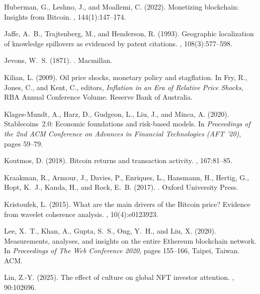 \documentclass[12pt]{article}
\begin{document}
\begin{thebibliography}{}
Huberman, G., Leshno, J., and Moallemi, C. (2022).
\newblock Monetizing blockchain: Insights from Bitcoin.
, 144(1):147--174.

Jaffe, A.~B., Trajtenberg, M., and Henderson, R. (1993).
\newblock Geographic localization of knowledge spillovers as evidenced by
  patent citations.
, 108(3):577--598.

Jevons, W.~S. (1871).
.
\newblock Macmillan.

Kilian, L. (2009).
\newblock Oil price shocks, monetary policy and stagflation.
\newblock In Fry, R., Jones, C., and Kent, C., editors, {\em Inflation in an
  Era of Relative Price Shocks}, RBA Annual Conference Volume. Reserve Bank of
  Australia.

Klages-Mundt, A., Harz, D., Gudgeon, L., Liu, J., and Minca, A. (2020).
\newblock Stablecoins 2.0: Economic foundations and risk-based models.
\newblock In {\em Proceedings of the 2nd ACM Conference on Advances in
  Financial Technologies (AFT ’20)}, pages 59--79.

Koutmos, D. (2018).
\newblock Bitcoin returns and transaction activity.
, 167:81--85.

Kraakman, R., Armour, J., Davies, P., Enriques, L., Hansmann, H., Hertig, G.,
  Hopt, K.~J., Kanda, H., and Rock, E.~B. (2017).
.
\newblock Oxford University Press.

Kristoufek, L. (2015).
\newblock What are the main drivers of the Bitcoin price? Evidence from wavelet
  coherence analysis.
, 10(4):e0123923.

Lee, X.~T., Khan, A., Gupta, S.~S., Ong, Y.~H., and Liu, X. (2020).
\newblock Measurements, analyses, and insights on the entire Ethereum
  blockchain network.
\newblock In {\em Proceedings of The Web Conference 2020}, pages 155--166,
  Taipei, Taiwan. ACM.

Lin, Z.-Y. (2025).
\newblock The effect of culture on global NFT investor attention.
, 90:102696.


\end{thebibliography}
\end{document}
